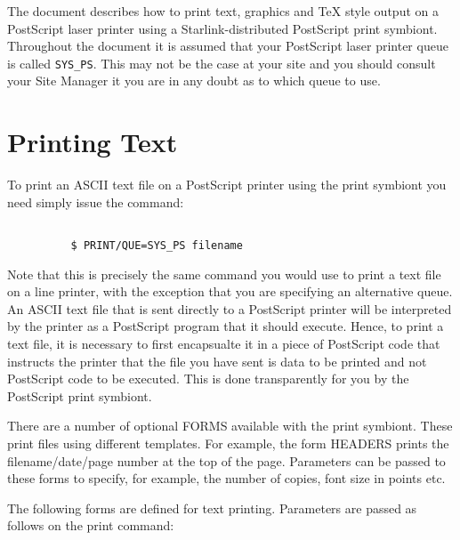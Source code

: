 The document describes how to print text, graphics and \TeX\/ style output on a
PostScript laser printer using a Starlink-distributed PostScript print
symbiont. Throughout the document it is assumed that your PostScript laser
printer queue is called {\tt SYS\_PS}. This may not be the case at your site
and you should consult your Site Manager it you are in any doubt as to which
queue to use.

\section{Printing Text}

To print an ASCII text file on a PostScript printer using the print symbiont
you need simply issue the command:

\begin{verbatim}

          $ PRINT/QUE=SYS_PS filename

\end{verbatim}

Note that this is precisely the same command you would use to print a text file
on a line printer, with the exception that you are specifying an alternative
queue. An ASCII text file that is sent directly to a PostScript printer will be
interpreted by the printer as a PostScript program that it should execute.
Hence, to print a text file, it is necessary to first encapsualte it in a piece
of PostScript code that instructs the printer that the file you have sent is
data to be printed and not PostScript code to be executed. This is done
transparently for you by the PostScript print symbiont.

There are a number of optional FORMS available with the print symbiont. These
print files using different templates. For example, the form HEADERS prints
the filename/date/page number at the top of the page. Parameters can be passed
to these forms to specify, for example, the number of copies, font size in
points etc.

The following forms are defined for text printing. Parameters are passed as
follows on the print command:

